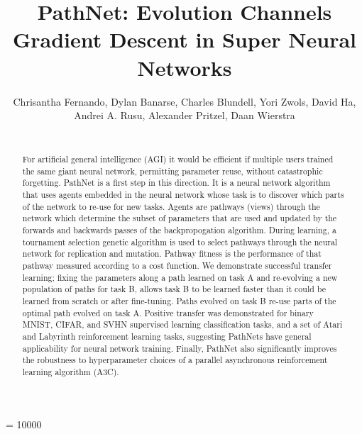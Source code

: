 \documentclass{sig-alternate-05-2015}
\begin{document}
\widowpenalty = 10000
\title{PathNet: Evolution Channels Gradient Descent in Super Neural Networks}
\author{
\alignauthor
Chrisantha Fernando, Dylan Banarse, Charles Blundell, Yori Zwols, David Ha, Andrei A. Rusu, Alexander Pritzel, Daan Wierstra\\
       \\
}

\maketitle
\begin{abstract}
For artificial general intelligence (AGI) it would be efficient if multiple users trained the same giant neural network, permitting parameter reuse, without catastrophic forgetting. PathNet is a first step in this direction. It is a neural network algorithm that uses agents embedded in the neural network whose task is to discover which parts of the network to re-use for new tasks. Agents are pathways (views) through the network which determine the subset of parameters that are used and updated by the forwards and backwards passes of the backpropogation algorithm. During learning, a tournament selection genetic algorithm is used to select pathways through the neural network for replication and mutation. Pathway fitness is the performance of that pathway measured according to a cost function. We demonstrate successful transfer learning; fixing the parameters along a path learned on task A and re-evolving a new population of paths for task B, allows task B to be learned faster than it could be learned from scratch or after fine-tuning. Paths evolved on task B re-use parts of the optimal path evolved on task A. Positive transfer was demonstrated for binary MNIST, CIFAR, and SVHN supervised learning classification tasks, and a set of Atari and Labyrinth reinforcement learning tasks, suggesting PathNets have general applicability for neural network training. Finally, PathNet also significantly improves the robustness to hyperparameter choices of a parallel asynchronous reinforcement learning algorithm (A3C). \end{abstract}



\printccsdesc



\end{document}

